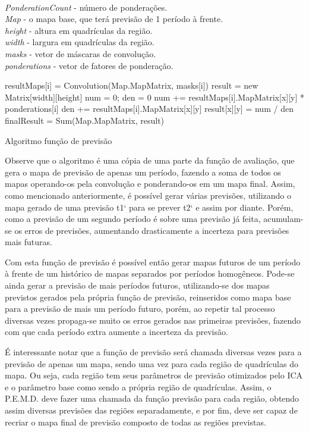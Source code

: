 \begin{algorithm}[h]
	\SetAlgoLined
	\KwData
	{
		\\ \emph{PonderationCount} - número de ponderações.
		\\ \emph{Map} - o mapa base, que terá previsão de 1 período à frente.
		\\ \emph{height} - altura em quadrículas da região.
		\\ \emph{width} - largura em quadrículas da região.
		\\ \emph{masks} - vetor de máscaras de convolução.
		\\ \emph{ponderations} - vetor de fatores de ponderação. 
	}
	
	{
		resultMaps[i] = Convolution(Map.MapMatrix, masks[i])\;
	}
	result = new Matrix[width][height]\;
	{
		{
			num = 0; den = 0\;
			{
				num += resultMaps[i].MapMatrix[x][y] * ponderations[i]\;
				den += resultMaps[i].MapMatrix[x][y]\;
			}
			result[x][y] = num / den\;
		}
	}
	finalResult = Sum(Map.MapMatrix, result)\;
	
	\caption{Algoritmo função de previsão}
	\label{alg:Fp}
\end{algorithm}

Observe que o algoritmo é uma cópia de uma parte da função de avaliação, que gera o mapa de previsão de apenas um período, fazendo a soma de todos os mapas operando-os pela convolução e ponderando-os em um mapa final. Assim, como mencionado anteriormente, é possível gerar várias previsões, utilizando o mapa gerado de uma previsão t1` para se prever t2` e assim por diante. Porém, como a previsão de um segundo período é sobre uma previsão já feita, acumulam-se os erros de previsões, aumentando drasticamente a incerteza para previsões mais futuras.

Com esta função de previsão é possível então gerar mapas futuros de um período à frente de um histórico de mapas separados por períodos homogêneos. Pode-se ainda gerar a previsão de mais períodos futuros, utilizando-se dos mapas previstos gerados pela própria função de previsão, reinseridos como mapa base para a previsão de mais um período futuro, porém, ao repetir tal processo diversas vezes propaga-se muito os erros gerados nas primeiras previsões, fazendo com que cada período extra aumente a incerteza da previsão. 

É interessante notar que a função de previsão será chamada diversas vezes para a previsão de apenas um mapa, sendo uma vez para cada região de quadrículas do mapa. Ou seja, cada região tem seus parâmetros de previsão otimizados pelo ICA e o parâmetro base como sendo a própria região de quadrículas. Assim, o P.E.M.D. deve fazer uma chamada da função previsão para cada região, obtendo assim diversas previsões das regiões separadamente, e por fim, deve ser capaz de recriar o mapa final de previsão composto de todas as regiões previstas.





